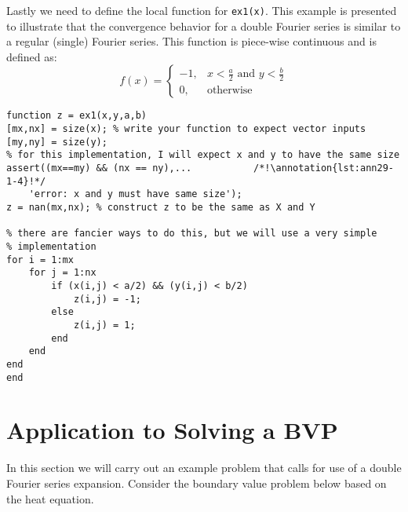 Lastly we need to define the local function for \lstinline[style=myMatlab]{ex1(x)}.  This example is presented to illustrate that the convergence behavior for a double Fourier series is similar to a regular (single) Fourier series.  This function is piece-wise continuous and is defined as:
\begin{equation*}
f(x) = 
\begin{cases}
-1, & x < \frac{a}{2} \text{ and } y < \frac{b}{2} \\
0, & \text{otherwise}
\end{cases}
\end{equation*}
\begin{lstlisting}[style=myMatlab, name=lec29-ex1]
%% Local functions
function z = ex1(x,y,a,b)
[mx,nx] = size(x); % write your function to expect vector inputs
[my,ny] = size(y);
% for this implementation, I will expect x and y to have the same size
assert((mx==my) && (nx == ny),...           /*!\annotation{lst:ann29-1-4}!*/
    'error: x and y must have same size');
z = nan(mx,nx); % construct z to be the same as X and Y

% there are fancier ways to do this, but we will use a very simple
% implementation
for i = 1:mx
    for j = 1:nx
        if (x(i,j) < a/2) && (y(i,j) < b/2)
            z(i,j) = -1;
        else
            z(i,j) = 1;
        end
    end
end
end
\end{lstlisting}

\section{Application to Solving a BVP}
In this section we will carry out an example problem that calls for use of a double Fourier series expansion.  Consider the boundary value problem below based on the heat equation. 

